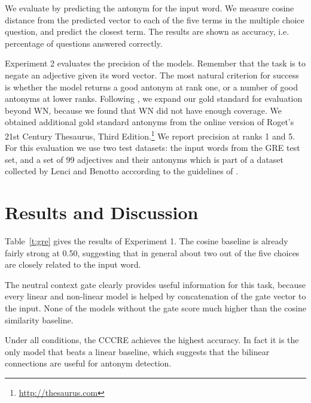 \documentclass[11pt]{article}
\begin{document}
We evaluate by predicting the antonym for the input word. We measure cosine distance from the predicted vector to each of the five terms in the multiple choice question, and predict the closest term. The results are shown as accuracy, i.e. percentage of questions answered correctly.

Experiment 2 evaluates the precision of the models. Remember that the task is to negate an adjective given its word vector. The most natural criterion for success is whether the model returns a good antonym at rank one, or a number of good antonyms at lower ranks. Following \citep{gorman:05}, we expand our gold standard for evaluation beyond WN, because we found that WN did not have enough coverage. We obtained additional gold standard antonyms from the online version of Roget's 21st Century Thesaurus, Third Edition.\footnote{\url{http://thesaurus.com}} We report precision at ranks 1 and 5. For this evaluation we use two test datasets: the input words from the GRE test set, and a set of 99 adjectives and their antonyms which is part of a dataset collected by Lenci and Benotto acccording to the guidelines of \citet{walde:13}.




\section{Results and Discussion}



Table~\ref{t:gre} gives the results of Experiment 1. The cosine baseline is already fairly strong at 0.50, suggesting that in general about two out of the five choices are closely related to the input word.

The neutral context gate clearly provides useful information for this task, because every linear and non-linear model is helped by concatenation of the gate vector to the input. None of the models without the gate score much higher than the cosine similarity baseline.

Under all conditions, the CCCRE achieves the highest accuracy. In fact it is the only model that beats a linear baseline, which suggests that the bilinear connections are useful for antonym detection.

\end{document}
